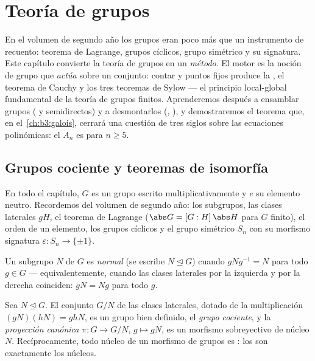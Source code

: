 \chapter{Teoría de grupos}\label{ch:b3:groups}

En el volumen de segundo año los grupos eran poco más que un instrumento
de recuento: teorema de Lagrange, grupos cíclicos, grupo simétrico y su
signatura. Este capítulo convierte la teoría de grupos en un
\emph{método}. El motor es la noción de grupo que \emph{actúa} sobre un
conjunto: contar  y puntos fijos
produce la , el
teorema de Cauchy y los tres teoremas de Sylow --- el principio
local-global fundamental de la teoría de grupos finitos. Aprenderemos
después a ensamblar grupos ( y
semidirectos) y a desmontarlos
(,
), y demostraremos el
teorema que, en el~\cref{ch:b3:galois}, cerrará una cuestión de tres
siglos sobre las ecuaciones polinómicas: el
 $A_n$ es
 para $n
\geq 5$.

\section{Grupos cociente y teoremas de isomorfía}

En todo el capítulo, $G$ es un grupo escrito multiplicativamente y $e$
su elemento neutro. Recordemos del volumen de segundo año: los
subgrupos, las clases laterales $gH$, el teorema de Lagrange
($\abs G = [G:H]\,\abs H$ para $G$ finito), el orden de un elemento, los
grupos cíclicos y el grupo simétrico $S_n$ con su morfismo signatura
$\varepsilon \colon S_n \to \{\pm1\}$.

\begin{definition}\label{def:b3:groups:normal}
Un subgrupo $N$ de $G$ es \emph{normal} (se
escribe $N \trianglelefteq G$) cuando $gNg^{-1} = N$ para todo $g
\in G$ --- equivalentemente, cuando las clases laterales por la
izquierda y por la derecha coinciden: $gN =
Ng$ para todo $g$.
\end{definition}

\begin{theorem}\label{thm:b3:groups:quotient}
Sea $N \trianglelefteq G$. El conjunto $G/N$ de las clases laterales,
dotado de la multiplicación $(gN)(hN) = ghN$, es un grupo bien definido,
el \emph{grupo cociente}, y la \emph{proyección
canónica} $\pi \colon G \to G/N$, $g \mapsto gN$, es un morfismo
sobreyectivo de núcleo $N$. Recíprocamente, todo núcleo de un morfismo
de grupos es : los
 son exactamente los
núcleos.
\end{theorem}

